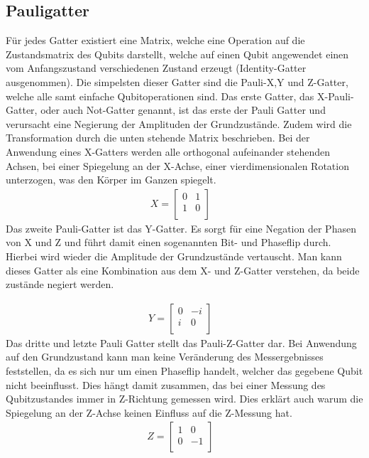 \documentclass[12pt]{report}
\begin{document}
	\subsection{Pauligatter}
	Für jedes Gatter existiert eine Matrix, welche eine Operation auf die Zustandsmatrix des Qubits darstellt, welche auf einen Qubit angewendet einen vom Anfangszustand verschiedenen Zustand erzeugt (Identity-Gatter ausgenommen). Die simpelsten dieser Gatter sind die Pauli-X,Y und Z-Gatter, welche alle samt einfache Qubitoperationen sind. Das erste Gatter, das X-Pauli-Gatter, oder auch Not-Gatter genannt, ist das erste der Pauli Gatter und verursacht eine Negierung der Amplituden der Grundzustände. Zudem wird die Transformation durch die unten stehende Matrix beschrieben. Bei der Anwendung eines X-Gatters werden alle orthogonal aufeinander stehenden Achsen, bei einer Spiegelung an der X-Achse, einer vierdimensionalen Rotation unterzogen, was den Körper im Ganzen spiegelt. 
\begin{align*}
X= \begin{bmatrix} 
0&1\\
1&0\\
\end{bmatrix} &
\end{align*}
\newpage
Das zweite Pauli-Gatter ist das Y-Gatter. Es sorgt für eine Negation der Phasen von X und Z und führt damit einen sogenannten Bit- und Phaseflip durch. Hierbei wird wieder die Amplitude der Grundzustände vertauscht. Man kann dieses Gatter als eine Kombination aus dem X- und Z-Gatter verstehen, da beide zustände negiert werden.


\begin{align*}
Y= \begin{bmatrix} 
0&-i\\
i&0\\
\end{bmatrix} &
\end{align*}
Das dritte und letzte Pauli Gatter stellt das Pauli-Z-Gatter dar. Bei Anwendung auf den Grundzustand kann man keine Veränderung des Messergebnisses feststellen, da es sich nur um einen Phaseflip handelt, welcher das gegebene Qubit nicht beeinflusst. Dies hängt damit zusammen, das bei einer Messung des Qubitzustandes immer in Z-Richtung gemessen wird. Dies erklärt auch warum die Spiegelung an der Z-Achse keinen Einfluss auf die Z-Messung hat.
\begin{align*}
Z= \begin{bmatrix} 
1&0\\
0&-1\\
\end{bmatrix} &
\end{align*}
\end{document}
